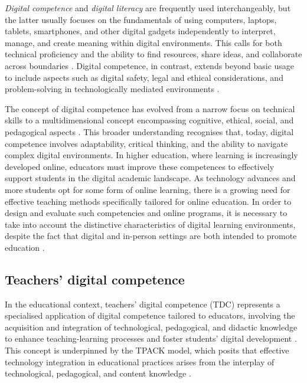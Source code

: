 \documentclass[english]{textolivre}
\begin{document}
\textit{Digital competence} and \textit{digital literacy} are frequently used interchangeably, but the latter usually focuses on the fundamentals of using computers, laptops, tablets, smartphones, and other digital gadgets independently to interpret, manage, and create meaning within digital environments. This calls for both technical proficiency and the ability to find resources, share ideas, and collaborate across boundaries \cite{EsteveMon2020,Falloon2020,pegrum2022digitalliteracies}. Digital competence, in contrast, extends beyond basic usage to include aspects such as digital safety, legal and ethical considerations, and problem-solving in technologically mediated environments \cite{CouncilEU2018,EsteveMon2020,Falloon2020,redecker2017digcompedu}.

The concept of digital competence has evolved from a narrow focus on technical skills to a multidimensional concept encompassing cognitive, ethical, social, and pedagogical aspects \cite{santos2023edigcompedu}. This broader understanding recognises that, today, digital competence involves adaptability, critical thinking, and the ability to navigate complex digital environments. In higher education, where learning is increasingly developed online, educators must improve these competences to effectively support students in the digital academic landscape. As technology advances and more students opt for some form of online learning, there is a growing need for effective teaching methods specifically tailored for online education. In order to design and evaluate such competencies and online programs, it is necessary to take into account the distinctive characteristics of digital learning environments, despite the fact that digital and in-person settings are both intended to promote education \cite{GarcesBastias2024}.


\subsection{Teachers’ digital competence}\label{sec-fmt-manuscrito}
In the educational context, teachers’ digital competence (TDC) represents a specialised application of digital competence tailored to educators, involving the acquisition and integration of technological, pedagogical, and didactic knowledge to enhance teaching-learning processes and foster students’ digital development \cite{DiasTrindade2020,EsteveMon2020,Falloon2020,santos2024applicability}. This concept is underpinned by the TPACK model, which posits that effective technology integration in educational practices arises from the interplay of technological, pedagogical, and content knowledge \cite{DiasTrindade2021,koehler2013tpack}.
\end{document}
